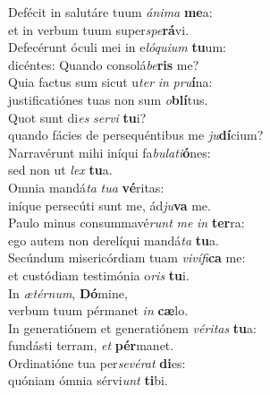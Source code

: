 \oddverse Defécit in salutáre tuum \textit{á}\textit{ni}\textit{ma} \textbf{me}a:~\*\\
\oddverse et in verbum tuum super\textit{spe}\textbf{rá}vi.\\
\evenverse Defecérunt óculi mei in e\textit{ló}\textit{qui}\textit{um} \textbf{tu}um:~\*\\
\evenverse dicéntes: Quando consolá\textit{be}\textbf{ris} me?\\
\oddverse Quia factus sum sicut u\textit{ter} \textit{in} \textit{pru}\textbf{í}na:~\*\\
\oddverse justificatiónes tuas non sum \textit{o}\textbf{blí}tus.\\
\evenverse Quot sunt di\textit{es} \textit{ser}\textit{vi} \textbf{tu}i?~\*\\
\evenverse quando fácies de persequéntibus me \textit{ju}\textbf{dí}cium?\\
\oddverse Narravérunt mihi iníqui fa\textit{bu}\textit{la}\textit{ti}\textbf{ó}nes:~\*\\
\oddverse sed non ut \textit{lex} \textbf{tu}a.\\
\evenverse Omnia mandá\textit{ta} \textit{tu}\textit{a} \textbf{vé}ritas:~\*\\
\evenverse iníque persecúti sunt me, ád\textit{ju}\textbf{va} me.\\
\oddverse Paulo minus consummavé\textit{runt} \textit{me} \textit{in} \textbf{ter}ra:~\*\\
\oddverse ego autem non derelíqui mandá\textit{ta} \textbf{tu}a.\\
\evenverse Secúndum misericórdiam tuam \textit{vi}\textit{ví}\textit{fi}\textbf{ca} me:~\*\\
\evenverse et custódiam testimónia o\textit{ris} \textbf{tu}i.\\
\oddverse In \textit{æ}\textit{tér}\textit{num}, \textbf{Dó}mine,~\*\\
\oddverse verbum tuum pérmanet \textit{in} \textbf{cæ}lo.\\
\evenverse In generatiónem et generatiónem \textit{vé}\textit{ri}\textit{tas} \textbf{tu}a:~\*\\
\evenverse fundásti terram, \textit{et} \textbf{pér}manet.\\
\oddverse Ordinatióne tua per\textit{se}\textit{vé}\textit{rat} \textbf{di}es:~\*\\
\oddverse quóniam ómnia sérvi\textit{unt} \textbf{ti}bi.\\
